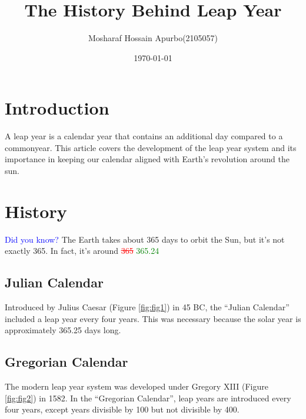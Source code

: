 \documentclass[12pt]{article}
\title{The History Behind Leap Year}
\author{Mosharaf Hossain Apurbo(2105057)}
\date{\today}
\begin{document}
\sloppy 

\maketitle

\section{Introduction}

A leap year is a calendar year that contains an additional day compared to a commonyear\cite{meeus1991astronomical}. This article covers the development of the leap year system and its importance in keeping our calendar aligned with Earth’s revolution around the sun.

\section{History}
\textcolor{blue}{Did you know?} The Earth takes about 365 days to orbit the Sun, but it’s not exactly 365. In fact, it’s around \textcolor{red}{\sout{365}} \textcolor{green}{365.24}

    \subsection{Julian Calendar}
    Introduced by Julius Caesar (Figure \ref{fig:fig1}) in 45 BC, the “Julian Calendar” included a leap year every four years. This was necessary because the solar year is approximately 365.25 days long.

    \subsection{Gregorian Calendar}
     The modern leap year system was developed under Gregory XIII (Figure \ref{fig:fig2}) in 1582. In the “Gregorian Calendar”, leap years are introduced every four years, except years divisible by 100 but not divisible by 400.
\end{document}
